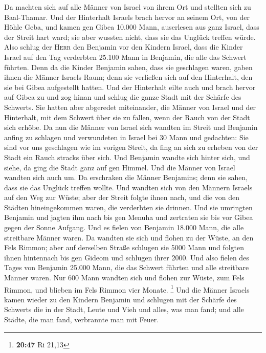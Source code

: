  Da machten sich auf alle Männer von Israel von ihrem Ort
und stellten sich zu Baal-Thamar. Und der Hinterhalt Israels brach
hervor an seinem Ort, von der Höhle Geba,  und kamen gen
Gibea 10.000 Mann, auserlesen aus ganz Israel, dass der Streit hart
ward; sie aber wussten nicht, dass sie das Unglück treffen würde.
 Also schlug der \textsc{Herr} den Benjamin vor den
Kindern Israel, dass die Kinder Israel auf den Tag verderbten 25.100
Mann in Benjamin, die alle das Schwert führten.  Denn da
die Kinder Benjamin sahen, dass sie geschlagen waren, gaben ihnen die
Männer Israels Raum; denn sie verließen sich auf den Hinterhalt, den sie
bei Gibea aufgestellt hatten.  Und der Hinterhalt eilte
auch und brach hervor auf Gibea zu und zog hinan und schlug die ganze
Stadt mit der Schärfe des Schwerts.  Sie hatten aber
abgeredet miteinander, die Männer von Israel und der Hinterhalt, mit dem
Schwert über sie zu fallen, wenn der Rauch von der Stadt sich erhöbe.
 Da nun die Männer von Israel sich wandten im Streit und
Benjamin anfing zu schlagen und verwundeten in Israel bei 30 Mann und
gedachten: Sie sind vor uns geschlagen wie im vorigen Streit,
 da fing an sich zu erheben von der Stadt ein Rauch
stracks über sich. Und Benjamin wandte sich hinter sich, und siehe, da
ging die Stadt ganz auf gen Himmel.  Und die Männer von
Israel wandten sich auch um. Da erschraken die Männer Benjamins; denn
sie sahen, dass sie das Unglück treffen wollte.  Und
wandten sich von den Männern Israels auf den Weg zur Wüste; aber der
Streit folgte ihnen nach, und die von den Städten hineingekommen waren,
die verderbten sie drinnen.  Und sie umringten Benjamin
und jagten ihm nach bis gen Menuha und zertraten sie bis vor Gibea gegen
der Sonne Aufgang.  Und es fielen von Benjamin 18.000
Mann, die alle streitbare Männer waren.  Da wandten sie
sich und flohen zu der Wüste, an den Fels Rimmon; aber auf derselben
Straße schlugen sie 5000 Mann und folgten ihnen hintennach bis gen
Gideom und schlugen ihrer 2000.  Und also fielen des
Tages von Benjamin 25.000 Mann, die das Schwert führten und alle
streitbare Männer waren.  Nur 600 Mann wandten sich und
flohen zur Wüste, zum Fels Rimmon, und blieben im Fels Rimmon vier
Monate. \footnote{\textbf{20:47} Ri 21,13}  Und die
Männer Israels kamen wieder zu den Kindern Benjamin und schlugen mit der
Schärfe des Schwerts die in der Stadt, Leute und Vieh und alles, was man
fand; und alle Städte, die man fand, verbrannte man mit Feuer.

